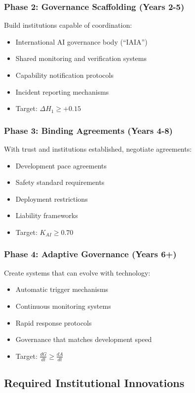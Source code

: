 \documentclass[11pt,letterpaper]{article}
\newcommand{\Kai}{K_{AI}}
\begin{document}
\subsubsection{Phase 2: Governance Scaffolding (Years 2-5)}

Build institutions capable of coordination:
\begin{itemize}
\item International AI governance body (``IAIA'')
\item Shared monitoring and verification systems
\item Capability notification protocols
\item Incident reporting mechanisms
\item Target: $\Delta H_1 \geq +0.15$
\end{itemize}

\subsubsection{Phase 3: Binding Agreements (Years 4-8)}

With trust and institutions established, negotiate agreements:
\begin{itemize}
\item Development pace agreements
\item Safety standard requirements
\item Deployment restrictions
\item Liability frameworks
\item Target: $\Kai \geq 0.70$
\end{itemize}

\subsubsection{Phase 4: Adaptive Governance (Years 6+)}

Create systems that can evolve with technology:
\begin{itemize}
\item Automatic trigger mechanisms
\item Continuous monitoring systems
\item Rapid response protocols
\item Governance that matches development speed
\item Target: $\frac{dG}{dt} \geq \frac{dA}{dt}$
\end{itemize}

\subsection{Required Institutional Innovations}
\end{document}
